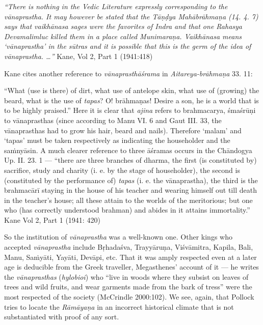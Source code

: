 \begin{myquote}
{{\sl “There is nothing in the Vedic Literature expressly corresponding to the vānaprastha. It may however be stated that the Tāṇḍya Mahābrāhmaṇa (14. 4. 7) says that {\sl vaikhānasa} sages were the favorites of Indra and that one Rahasya Devamalimluc killed them in a place called Munimaraṇa. Vaikhānasa means ‘vānaprastha’ in the sūtras and it is possible that this is the germ of the idea of vānaprastha. …”}}
\hfill  Kane, Vol 2, Part 1 (1941:418)
\end{myquote}

Kane cites another reference to {\sl vānaprasthāśrama} in {\sl Aitareya-brāhmaṇa} 33. 11:

\begin{myquote}
“What (use is there) of dirt, what use of antelope skin, what use of (growing) the beard, what is the use of {\sl tapas}? O! brāhmaṇas! Desire a son, he is a world that is to be highly praised.” Here it is clear that {\sl ajina} refers to brahmacarya, śmaśrūṇi to vānaprasthas (since according to Manu VI. 6 and Gaut III. 33, the vānaprasthas had to grow his hair, beard and nails). Therefore `malam’ and `tapas' must be taken respectively as indicating the householder and the saṁnyāsin. A much clearer reference to three āśramas occurs in the Chāndogya Up. II. 23. 1 --- “there are three branches of dharma, the first (is constituted by) sacrifice, study and charity (i. e. by the stage of householder), the second is (constituted by the performance of) {\sl tapas} (i. e. the vānaprastha), the third is the brahmacārī staying in the house of his teacher and wearing himself out till death in the teacher's house; all these attain to the worlds of the meritorious; but one who (has correctly understood brahman) and abides in it attains immortality.”
\hfill Kane Vol 2, Part 1 (1941: 420)
\end{myquote}

So the institution of {\sl vānaprastha} was a well-known one. Other kings who accepted {\sl vānaprastha} include Bṛhadaśva, Trayyāruṇa, Viśvāmitra, Kapila, Bali, Manu, Saṁyāti, Yayāti, Devāpi, etc. That it was amply respected even at a later age is deducible from the Greek traveller, Megasthenes’ account of it --- he writes the {\sl vānaprasthas} ({\sl hylobioi}) who “live in woods where they subsist on leaves of trees and wild fruits, and wear garments made from the bark of tress” were the most respected of the society (McCrindle 2000:102).  We see, again, that Pollock tries to locate the {\sl Rāmāyaṇa} in an incorrect historical climate that is not substantiated with proof of any sort. 

